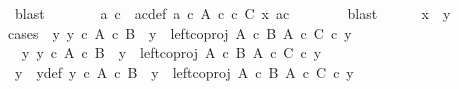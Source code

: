 \begin{isabellebody}
\ blast\isanewline
\ \ \ \ \isamarkupfalse%
\ \isamarkupfalse%
\ a\ c\ \ ac{\isacharunderscore}{\kern0pt}def{\isacharcolon}{\kern0pt}\ {\isachardoublequoteopen}a\ {\isasymin}\isactrlsub c\ A{\isachardoublequoteclose}\ {\isachardoublequoteopen}c\ {\isasymin}\isactrlsub c\ C{\isachardoublequoteclose}\ {\isachardoublequoteopen}x{\isacharprime}{\kern0pt}\ {\isacharequal}{\kern0pt}{\isasymlangle}a{\isacharcomma}{\kern0pt}c{\isasymrangle}{\isachardoublequoteclose}\isanewline
\ \ \ \ \ \ \isamarkupfalse%
\ blast\isanewline
\ \ \ \ \isamarkupfalse%
\ {\isachardoublequoteopen}x\ {\isacharequal}{\kern0pt}\ y{\isachardoublequoteclose}\ \ \isanewline
\ \ \ \ \isamarkupfalse%
{\isacharparenleft}{\kern0pt}cases\ {\isachardoublequoteopen}{\isasymexists}\ y{\isacharprime}{\kern0pt}{\isachardot}{\kern0pt}\ y{\isacharprime}{\kern0pt}\ {\isasymin}\isactrlsub c\ A\ {\isasymtimes}\isactrlsub c\ B\ {\isasymand}\ y\ {\isacharequal}{\kern0pt}\ left{\isacharunderscore}{\kern0pt}coproj\ {\isacharparenleft}{\kern0pt}A\ {\isasymtimes}\isactrlsub c\ B{\isacharparenright}{\kern0pt}\ {\isacharparenleft}{\kern0pt}A\ {\isasymtimes}\isactrlsub c\ C{\isacharparenright}{\kern0pt}\ {\isasymcirc}\isactrlsub c\ y{\isacharprime}{\kern0pt}{\isachardoublequoteclose}{\isacharparenright}{\kern0pt}\isanewline
\ \ \ \ \ \ \isamarkupfalse%
\ {\isachardoublequoteopen}{\isasymexists}\ y{\isacharprime}{\kern0pt}{\isachardot}{\kern0pt}\ y{\isacharprime}{\kern0pt}\ {\isasymin}\isactrlsub c\ A\ {\isasymtimes}\isactrlsub c\ B\ {\isasymand}\ y\ {\isacharequal}{\kern0pt}\ left{\isacharunderscore}{\kern0pt}coproj\ {\isacharparenleft}{\kern0pt}A\ {\isasymtimes}\isactrlsub c\ B{\isacharparenright}{\kern0pt}\ {\isacharparenleft}{\kern0pt}A\ {\isasymtimes}\isactrlsub c\ C{\isacharparenright}{\kern0pt}\ {\isasymcirc}\isactrlsub c\ y{\isacharprime}{\kern0pt}{\isachardoublequoteclose}\isanewline
\ \ \ \ \ \ \isamarkupfalse%
\ \isamarkupfalse%
\ y{\isacharprime}{\kern0pt}\ \ y{\isacharprime}{\kern0pt}{\isacharunderscore}{\kern0pt}def{\isacharcolon}{\kern0pt}\ {\isachardoublequoteopen}y{\isacharprime}{\kern0pt}\ {\isasymin}\isactrlsub c\ A\ {\isasymtimes}\isactrlsub c\ B\ {\isasymand}\ y\ {\isacharequal}{\kern0pt}\ left{\isacharunderscore}{\kern0pt}coproj\ {\isacharparenleft}{\kern0pt}A\ {\isasymtimes}\isactrlsub c\ B{\isacharparenright}{\kern0pt}\ {\isacharparenleft}{\kern0pt}A\ {\isasymtimes}\isactrlsub c\ C{\isacharparenright}{\kern0pt}\ {\isasymcirc}\isactrlsub c\ y{\isacharprime}{\kern0pt}{\isachardoublequoteclose}\isanewline

\end{isabellebody}
